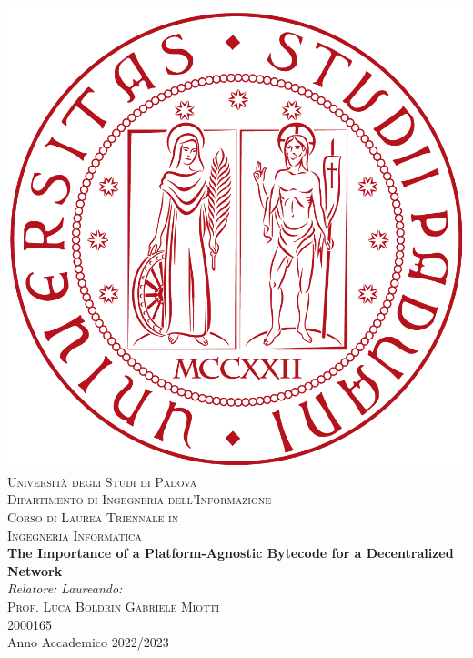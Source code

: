 



\begin{titlepage}
\begin{center}
\includegraphics[scale=0.1]{images/logo.png}\\

\vspace{0.8cm}
\textsc{\LARGE Universit\`{a} degli Studi di Padova}\\
\vspace{0.45cm}
\textsc{\large Dipartimento di Ingegneria dell'Informazione}\\
\vspace{0.4cm}
\textsc{\large Corso di Laurea Triennale in}\\
\textsc{\large Ingegneria Informatica}\\
\vfill
{ \LARGE \bfseries The Importance of a Platform-Agnostic Bytecode for a Decentralized Network
}\\
\vfill
\textit{\large Relatore:} \hfill \textit{\large Laureando:}\\
\textsc{\large Prof. Luca Boldrin} \hfill \textsc{Gabriele Miotti}\\
\hfill \textsc{2000165}\\

\vfill
{\large Anno Accademico 2022/2023}
\end{center}
\end{titlepage}


